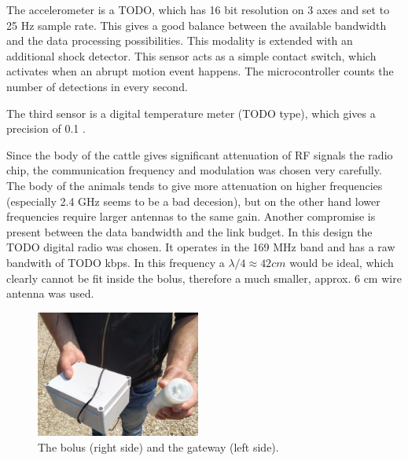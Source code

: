 \documentclass[conference]{IEEEtran}
\begin{document}
The accelerometer is a TODO, which has 16 bit resolution on 3 axes and
set to 25 Hz sample rate. This gives a good balance between the available
bandwidth and the data processing possibilities. This modality is extended
with an additional shock detector. This sensor acts as a simple contact switch,
which activates when an abrupt motion event happens. The microcontroller
counts the number of detections in every second.

The third sensor is a digital temperature meter (TODO type), which gives
a precision of 0.1 \textcelsius.

Since the body of the cattle gives significant attenuation of RF signals
the radio chip, the communication frequency and modulation was chosen very
carefully. The body of the animals tends to give more attenuation on higher
frequencies (especially 2.4 GHz seems to be a bad decesion), but on the
other hand lower frequencies require larger antennas to the same gain.
Another compromise is present between the data bandwidth and the link budget.
In this design the TODO digital radio was chosen. It operates in the 169 MHz
band and has a raw bandwith of TODO kbps. In this frequency a
$\lambda / 4 \approx 42 cm$ would be ideal, which clearly cannot be fit
inside the bolus, therefore a much smaller, approx. 6 cm wire antenna
was used.

\begin{figure}[htbp]
\centerline{\includegraphics[width=0.48\textwidth]{fig/bolus_gw_photo.jpg}}
  \caption{The bolus (right side) and the gateway (left side).}
\label{bolus-gw-photo}
\end{figure}
\end{document}
